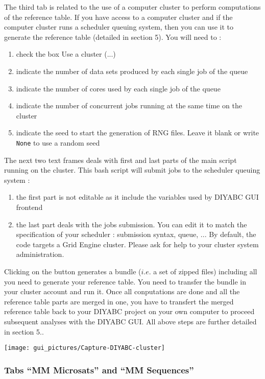 \label{clustergui} The third tab is related to the use of a computer
cluster to perform computations of the reference table. If you have
access to a computer cluster and if the computer cluster runs a scheduler
queuing system, then you can use it to generate the reference table
(detailed in section 5). You will need to :
\begin{enumerate}
\item check the box \textsf{Use a cluster (...)}
\item indicate the number of data sets produced by each single job of the
queue
\item indicate the number of cores used by each single job of the queue
\item indicate the number of concurrent jobs running at the same time on
the cluster
\item indicate the seed to start the generation of RNG files. Leave it blank
or write \texttt{None} to use a random seed
\end{enumerate}
The next two text frames deals with first and last parts of the main
script running on the cluster. This bash script will submit jobs to
the scheduler queuing system :
\begin{enumerate}
\item the first part is not editable as it include the variables used by
DIYABC GUI frontend
\item the last part deals with the jobs submission. You can edit it to match
the specification of your scheduler : submission syntax, queue, ...
By default, the code targets a Grid Engine cluster. Please ask for
help to your cluster system administration.
\end{enumerate}
Clicking on the  button generates
a bundle ($i.e.$ a set of zipped files) including all you need to
generate your reference table. You need to transfer the bundle in
your cluster account and run it. Once all conputations are done and
all the reference table parts are merged in one, you have to transfert
the merged reference table back to your DIYABC project on your own
computer to proceed subsequent analyses with the DIYABC GUI. All above
steps are further detailed in section 5..

\texttt{[image: gui\_pictures/Capture-DIYABC-cluster]}
\\



\subsubsection{Tabs \textsf{``MM Microsats''} and \textsf{``MM Sequences''}}

